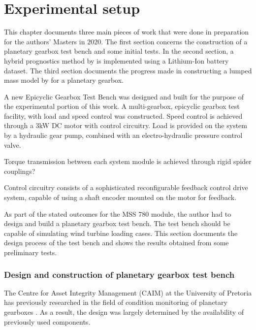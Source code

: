 
\chapter{Experimental setup} \label{S:Practical}
This chapter documents three main pieces of work that were done in preparation for the authors' Masters in $2020$. The first section concerns the construction of a planetary gearbox test bench and some initial tests. In the second section, a hybrid prognostics method by \cite{Liao2016} is implemented using a Lithium-Ion battery dataset. The third section documents the progress made in constructing a lumped mass model by \cite{Chaari2006} for a planetary gearbox.


A new Epicyclic Gearbox Test Bench was designed and built for the purpose of the experimental portion of this work. A multi-gearbox, epicyclic gearbox test facility, with load and speed control was constructed. Speed control is achieved through a 3kW DC motor with control circuitry. Load is provided on the system by a hydraulic gear pump, combined with an electro-hydraulic pressure control valve. \cite{Schon2005}

Torque transmission between each system module is achieved through rigid spider couplings? \cite{Schon2005}

Control circuitry consists of a sophisticated reconfigurable feedback control drive system, capable of using a shaft encoder mounted on the motor for feedback.








As part of the stated outcomes for the MSS 780 module, the author had to design and build a planetary gearbox test bench. The test bench should be capable of simulating wind turbine loading cases. This section documents the design process of the test bench and shows the results obtained from some preliminary tests.
\subsection{Design and construction of planetary gearbox test bench}
The Centre for Asset Integrity Management (CAIM) at the University of Pretoria has previously researched in the field of condition monitoring of planetary gearboxes \citep{Schon2005,Smidt2009}. As a result, the design was largely determined by the availability of previously used components. 

